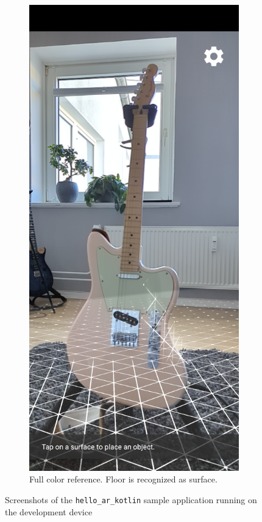 \begin{figure}[ht!]
\begin{subfigure}[t]{.45\textwidth}
        \includegraphics[width=.8\textwidth]{images/depth_api_hello_world_img}
        \caption{Full color reference. Floor is recognized as surface.}
    \end{subfigure}
    \caption{Screenshots of the \texttt{hello\_ar\_kotlin} sample application running on the development device}
    \label{fig:hello_world_screenshot}
\end{figure}
